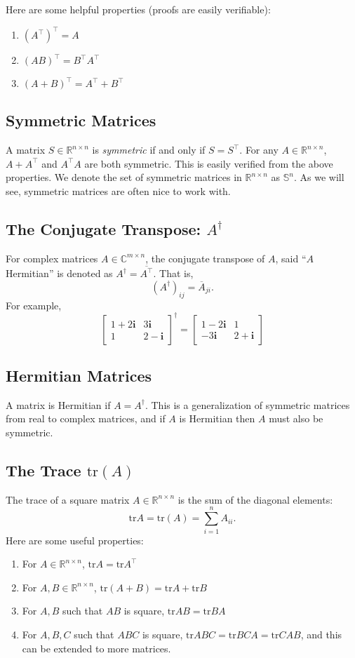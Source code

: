 \documentclass{article}
\newcommand{\1}{\mathbf{1}}
\newcommand{\tr}{\mathrm{tr}}
\newcommand{\0}{\mathbf{0}}
\newcommand{\ii}{\mathbf{i}}
\newcommand{\RR}{\mathbb{R}}
\newcommand{\CC}{\mathbb{C}}
\renewcommand{\SS}{\mathbb{S}}
\newcommand{\T}{\top}
\newcommand{\m}[1]{\begin{bmatrix} #1 \end{bmatrix}}
\begin{document}
Here are some helpful properties (proofs are easily verifiable):
\begin{enumerate}[-]
\item $(A^\T)^\T = A$
\item $(AB)^\T = B^\T A^\T$
\item $(A+B)^\T = A^\T + B^\T$
\end{enumerate}

\subsection{Symmetric Matrices}

A matrix $S\in\RR^{n\times n}$ is \textit{symmetric} if and only if
$S = S^\T$. For any $A\in\RR^{n\times n}$, $A+A^\T$ and $A^\T A$
are both symmetric. This is easily verified from the above properties.
We denote the set of symmetric matrices in $\RR^{n\times n}$ as $\SS^n$.
As we will see, symmetric matrices are often nice to work with.

\subsection{The Conjugate Transpose: $A^\dagger$}

For complex matrices $A\in\CC^{m\times n}$, the conjugate transpose of
$A$, said ``$A$ Hermitian'' is denoted as $A^\dagger = \overline{A^\T}$.
That is,
\[
    (A^\dagger)_{ij} = \overline{A}_{ji}.
\]
For example,
\[
    \m{1+2\ii & 3\ii\\ 1 & 2-\ii}^\dagger = \m{1-2\ii&1\\-3\ii&2+\ii}
\]

\subsection{Hermitian Matrices}

A matrix is Hermitian if $A = A^\dagger$. This is a generalization of symmetric
matrices from real to complex matrices, and if $A$ is Hermitian then $A$ must
also be symmetric.

\subsection{The Trace $\tr(A)$}

The trace of a square matrix $A\in\RR^{n\times n}$ is the sum of the diagonal
elements:
\[
    \tr A = \tr(A) = \sum_{i=1}^n A_{ii}.
\]
Here are some useful properties:
\begin{enumerate}[-]
\item For $A\in\RR^{n\times n}$, $\tr A = \tr A^\T$
\item For $A,B\in\RR^{n\times n}$, $\tr(A+B) = \tr A + \tr B$
\item For $A,B$ such that $AB$ is square, $\tr AB = \tr BA$
\item For $A,B,C$ such that $ABC$ is square, $\tr ABC = \tr BCA
    = \tr CAB$, and this can be extended to more matrices.
\end{enumerate}
\end{document}
